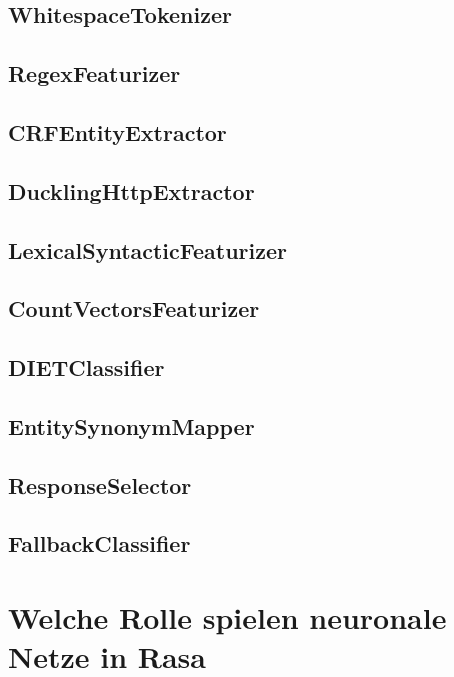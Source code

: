 \subsection{WhitespaceTokenizer}

\subsection{RegexFeaturizer}

\subsection{CRFEntityExtractor}

\subsection{DucklingHttpExtractor}

\subsection{LexicalSyntacticFeaturizer}

\subsection{CountVectorsFeaturizer}

\subsection{DIETClassifier}

\subsection{EntitySynonymMapper}

\subsection{ResponseSelector}

\subsection{FallbackClassifier}

\section{Welche Rolle spielen neuronale Netze in Rasa}


